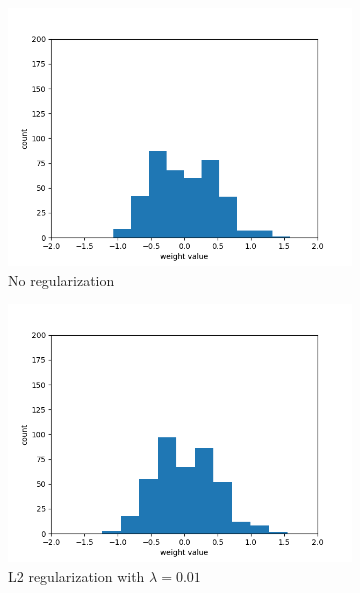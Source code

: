 \documentclass[a4paper]{article}
\begin{document}
\begin{figure}[h!]
	\centering
	\begin{subfigure}[b]{0.475\textwidth}
		\centering
		\includegraphics[width=\textwidth]{images/weight_histogram_0.png}
		\caption[Network2]%
		{{\small No regularization}}    
	\end{subfigure}
	\hfill
	\begin{subfigure}[b]{0.475\textwidth}  
		\centering 
		\includegraphics[width=\textwidth]{images/weight_histogram_0_01.png}
		\caption[]%
		{{\small L2 regularization with $\lambda = 0.01$}}   
	\end{subfigure}
	\hfill
	\begin{subfigure}[b]{0.475\textwidth}   

\end{subfigure}
\end{figure}
\end{document}
